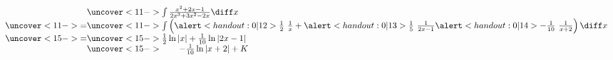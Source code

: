 \begin{frame}
\begin{example}
\begin{columns}[t]
\abovedisplayskip=0pt
\belowdisplayskip=0pt
\[
\begin{array}{c@{}l}
&  \uncover<11->{\int \frac{x^2+2x-1}{2x^3+3x^2-2x}\diff x}\\%
\uncover<11->{ = } & %
\uncover<11->{%
\int \left( \alert<handout:0| 12>{\frac{1}{2}} \ \frac{1}{x} + \alert<handout:0| 13>{\frac{1}{5}} \ \frac{1}{2x-1} \alert<handout:0| 14>{- \frac{1}{10}} \ \frac{1}{x+2}\right) \diff x%
}\\%
\uncover<15->{ = } & %
\uncover<15->{%
\frac{1}{2}\ln |x| + \frac{1}{10}\ln |2x-1|%
}\\%
 & %
\uncover<15->{%
\qquad -\frac{1}{10}\ln |x+2| + K%
}%
\end{array}
\]
\end{columns}
\end{example}
\end{frame}

